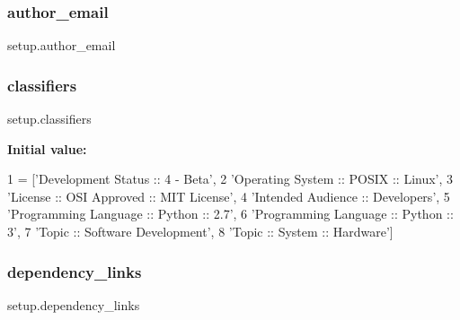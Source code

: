 \mbox{\label{namespacesetup_a5b08034343aa2be607722a8b315f3625}} 
\subsubsection{\texorpdfstring{author\+\_\+email}{author\_email}}
{\footnotesize\ttfamily setup.\+author\+\_\+email}

\mbox{\label{namespacesetup_abe96a9c38c1c61f9f0fdb002c482f785}} 
\subsubsection{\texorpdfstring{classifiers}{classifiers}}
{\footnotesize\ttfamily setup.\+classifiers}

{\bfseries Initial value\+:}
\begin{DoxyCode}
1 =  [\textcolor{stringliteral}{'Development Status :: 4 - Beta'},
2                \textcolor{stringliteral}{'Operating System :: POSIX :: Linux'},
3                \textcolor{stringliteral}{'License :: OSI Approved :: MIT License'},
4                \textcolor{stringliteral}{'Intended Audience :: Developers'},
5                \textcolor{stringliteral}{'Programming Language :: Python :: 2.7'},
6                \textcolor{stringliteral}{'Programming Language :: Python :: 3'},
7                \textcolor{stringliteral}{'Topic :: Software Development'},
8                \textcolor{stringliteral}{'Topic :: System :: Hardware'}]
\end{DoxyCode}
\mbox{\label{namespacesetup_a4c271d0ea7acb1aa7f9a8120390e89ba}} 
\subsubsection{\texorpdfstring{dependency\+\_\+links}{dependency\_links}}
{\footnotesize\ttfamily setup.\+dependency\+\_\+links}

\mbox{\label{namespacesetup_aedf461ec52a946bda975938ba0b93ec0}} 
